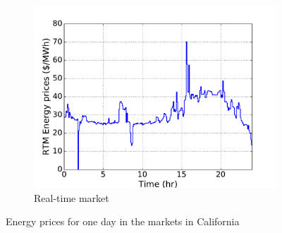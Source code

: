 \documentclass[11pt,twoside]{article}
\begin{document}
\begin{figure}[h!tp]
\begin{subfigure}[b]{0.32\textwidth} \includegraphics[width=\textwidth]{Figures/rtmprices.pdf} \caption{Real-time market}\label{rtmprices}\end{subfigure} \hfill
\caption{Energy prices for one day in the markets in California}\label{eprices}
\end{figure}
\end{document}
